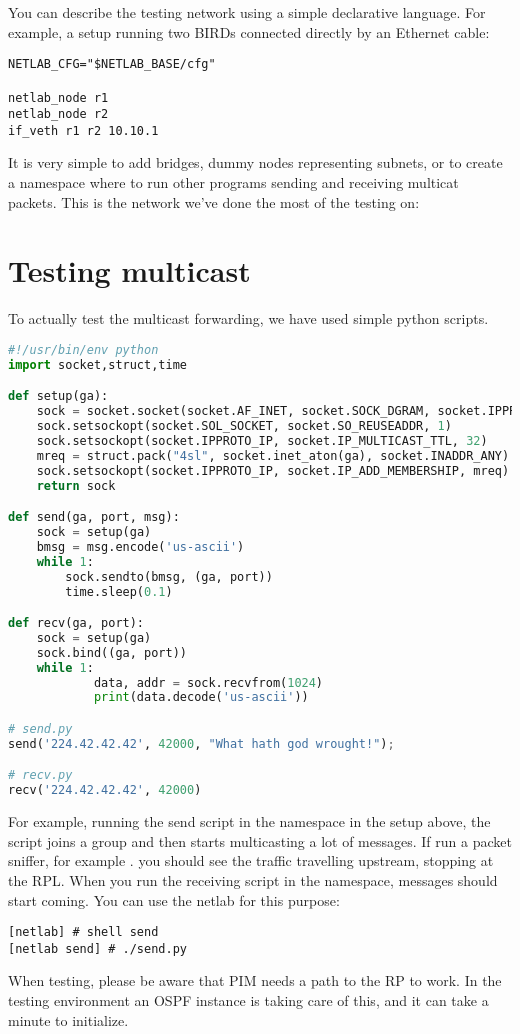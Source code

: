 You can describe the testing network using a simple declarative language. For
example, a setup running two BIRDs connected directly by an Ethernet cable:

\begin{lstlisting}
NETLAB_CFG="$NETLAB_BASE/cfg"

netlab_node r1
netlab_node r2
if_veth r1 r2 10.10.1
\end{lstlisting}

It is very simple to add bridges, dummy nodes representing subnets, or to
create a namespace where to run other programs sending and receiving multicat
packets. This is the network we've done the most of the testing on:

\begin{figure}[htp]
\centering
\vskip 10cm
\caption{}
\label{pim-channels}
\end{figure}

\section{Testing multicast}
To actually test the multicast forwarding, we have used simple python scripts.

\begin{lstlisting}[language=python]
#!/usr/bin/env python
import socket,struct,time

def setup(ga):
    sock = socket.socket(socket.AF_INET, socket.SOCK_DGRAM, socket.IPPROTO_UDP)
    sock.setsockopt(socket.SOL_SOCKET, socket.SO_REUSEADDR, 1)
    sock.setsockopt(socket.IPPROTO_IP, socket.IP_MULTICAST_TTL, 32)
    mreq = struct.pack("4sl", socket.inet_aton(ga), socket.INADDR_ANY)
    sock.setsockopt(socket.IPPROTO_IP, socket.IP_ADD_MEMBERSHIP, mreq)
    return sock

def send(ga, port, msg):
    sock = setup(ga)
    bmsg = msg.encode('us-ascii')
    while 1:
        sock.sendto(bmsg, (ga, port))
        time.sleep(0.1)

def recv(ga, port):
    sock = setup(ga)
    sock.bind((ga, port))
    while 1:
            data, addr = sock.recvfrom(1024)
            print(data.decode('us-ascii'))

# send.py
send('224.42.42.42', 42000, "What hath god wrought!");

# recv.py
recv('224.42.42.42', 42000)
\end{lstlisting}

For example, running the send script in the  namespace in the setup
above, the script joins a group and then starts multicasting a lot of messages.
If run a packet sniffer, for example . you should see the traffic
travelling upstream, stopping at the RPL. When you run the receiving script in
the  namespace, messages should start coming. You can use the netlab
for this purpose:

\begin{lstlisting}
[netlab] # shell send
[netlab send] # ./send.py
\end{lstlisting}

When testing, please be aware that PIM needs a path to the RP to work. In the
testing environment an OSPF instance is taking care of this, and it can take
a minute to initialize.
